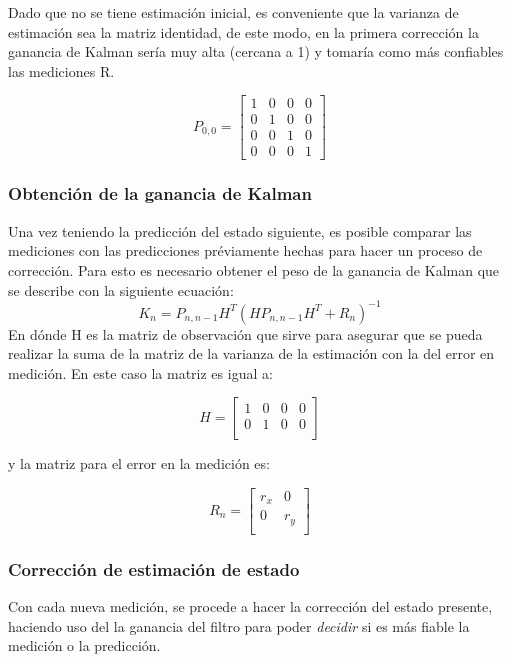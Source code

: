 Dado que no se tiene estimación inicial, es conveniente que la varianza de estimación sea la matriz identidad, de este modo, en la primera corrección la ganancia de Kalman sería muy alta (cercana a 1) y tomaría como más confiables las mediciones R.

\begin{equation}
P_{0,0} =
\begin{bmatrix}
1 & 0 & 0 & 0\\ 
0 & 1 & 0 & 0\\ 
0 & 0 & 1 & 0\\ 
0 & 0 & 0 & 1
\end{bmatrix}
\end{equation}	

		\subsubsection*{Obtención de la ganancia de Kalman}
	Una vez teniendo la predicción del estado siguiente, es posible comparar las mediciones con las predicciones préviamente hechas para hacer un proceso de corrección. Para esto es necesario obtener el peso de la ganancia de Kalman que se describe con la siguiente ecuación:
\begin{equation}
K_n = P_{n,n-1} H^T (H P_{n,n-1}H^T + R_n)^{-1}	
\end{equation}
	En dónde H es la matriz de observación que sirve para asegurar que se pueda realizar la suma de la matriz de la varianza de la estimación con la del error en medición. En este caso la matriz es igual a:
	
\begin{equation}
H = 
\begin{bmatrix}
1 & 0 & 0 & 0\\ 
0 & 1 & 0 & 0\\ 
\end{bmatrix}
\end{equation}
	
y la matriz para el error en la medición es:

\begin{equation}
R_n = 
\begin{bmatrix}
r_x & 0 \\ 
0 & r_y \\ 
\end{bmatrix}
\label{matrix:measurement_error}
\end{equation}

		\subsubsection*{Corrección de estimación de estado}
	Con cada nueva medición, se procede a hacer la corrección del estado presente, haciendo uso del la ganancia del filtro para poder \textit{decidir} si es más fiable la medición o la predicción.

